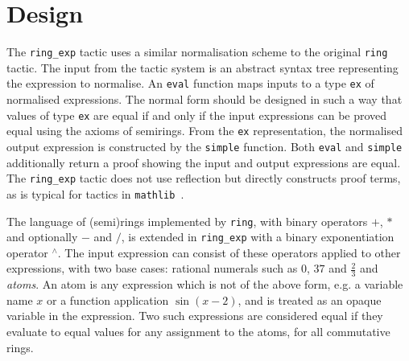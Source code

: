 \documentclass{llncs}
\newcommand{\lean}[1]{\texttt{#1}\xspace} %
\newcommand{\mathlib}{\texttt{mathlib}\xspace}
\newcommand{\pow}{{${}^\wedge$}\xspace}
\newcommand{\ring}{\lean{ring}}
\newcommand{\ringexp}{\lean{ring\_exp}}
\begin{document}
\section{Design}

The \ringexp tactic uses a similar normalisation scheme to the original \ring tactic.
The input from the tactic system is an abstract syntax tree representing the expression to normalise.
An \lean{eval} function maps inputs to a type \lean{ex} of normalised expressions.
The normal form should be designed in such a way that values of type \lean{ex} are equal
if and only if the input expressions can be proved equal using the axioms of semirings.
From the \lean{ex} representation, the normalised output expression is constructed by the \lean{simple} function.
Both \lean{eval} and \lean{simple} additionally return a proof showing the input and output expressions are equal.
The \ringexp tactic does not use reflection but directly constructs proof terms, as is typical for tactics in \mathlib~\cite{mathlib}.

The language of (semi)rings implemented by \ring, with binary operators $+$, $*$ and optionally $-$ and $/$,
is extended in \ringexp with a binary exponentiation operator \pow.
The input expression can consist of these operators applied to other expressions,
with two base cases: rational numerals such as $0$, $37$ and $\frac{2}{3}$ and \emph{atoms}.
An atom is any expression which is not of the above form, e.g. a variable name $x$ or a function application $\sin (x - 2)$,
and is treated as an opaque variable in the expression.
Two such expressions are considered equal if they evaluate to equal values for any assignment to the atoms, for all commutative rings.

\end{document}
